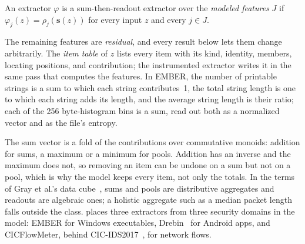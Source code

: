 \label{def:fw:extractor}
{
An extractor $\varphi$ is a sum-then-readout extractor over the \emph{modeled features} $J$ if
$\varphi_j(z) = \rho_j(\mathbf{s}(z))$ for every input $z$ and every $j \in J$.
}

The remaining features are \emph{residual}, and every result below lets them change arbitrarily. The \emph{item
table} of $z$ lists every item with its kind, identity, members, locating positions, and contribution; the
instrumented extractor writes it in the same pass that computes the features. In EMBER, the number of printable
strings is a sum to which each string contributes~1, the total string length is one to which each string adds its
length, and the average string length is their ratio; each of the 256 byte-histogram bins is a sum, read out both as a
normalized vector and as the file's entropy.

The sum vector is a fold of the contributions over commutative monoids: addition for sums, a maximum or a minimum for
pools.
Addition has an inverse and the maximum does not, so removing an item can be undone on a sum but not on a pool, which
is why the model keeps every item, not only the totals. In the terms of Gray et al.'s data cube~\cite{gray1997data}, sums and pools are distributive aggregates and readouts are
algebraic ones; a holistic aggregate such as a median packet length falls outside the class.
 places three extractors from three security domains in the model: EMBER for Windows
executables, Drebin~\cite{arp2014drebin} for Android apps, and CICFlowMeter, behind CIC-IDS2017~\cite{sharafaldin2018toward},
for network flows.

